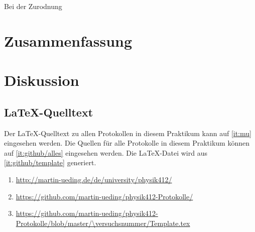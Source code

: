 Bei der Zurodnung

\chapter{Zusammenfassung}

\chapter{Diskussion}


\FloatBarrier
\begin{appendix}
    \FloatBarrier
    \chapter{\LaTeX-Quelltext}

    Der \LaTeX-Quelltext zu allen Protokollen in diesem Praktikum kann auf
    \ref{it:mu} eingesehen werden. Die Quellen für alle Protokolle in diesem
    Praktikum können auf \ref{it:github/alles} eingesehen werden. Die
    \LaTeX-Datei wird aus \ref{it:github/template} generiert.

    \begin{enumerate}
        \item
            \label{it:mu}
            \url{http://martin-ueding.de/de/university/physik412/}
        \item
            \label{it:github/alles}
            \url{https://github.com/martin-ueding/physik412-Protokolle/}
        \item
            \label{it:github/template}
            \url{https://github.com/martin-ueding/physik412-Protokolle/blob/master/\versuchsnummer/Template.tex}
    \end{enumerate}
\end{appendix}


\FloatBarrier
\printbibliography



